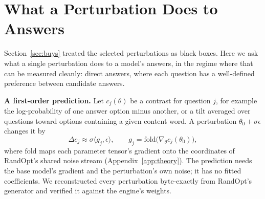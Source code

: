 \documentclass{article}
\begin{document}
\begin{table}[t]
  \centering\small
  \caption{\textbf{Same-run results} ($N{=}5000$, $K{=}50$; accuracy in \%, differences in points with paired 95\% CIs).
  SC: self-consistency over 50 samples of the unperturbed model; 1 gen.: one greedy answer of the unperturbed model
  (same engine as SC), so within a prompt block SC@50 $-$ 1 gen.\ is the voting effect and across blocks 1 gen.\ is the
  prompt effect. The chosen prompt (in parentheses) maximizes base accuracy on RandOpt's 200 selection questions among
  our three candidates; the public template is chosen by the same rule among public evaluation templates fixed before
  any was run (Section~\ref{sec:ps}).}
  \label{tab:samerun}
  \footnotesize\setlength{\tabcolsep}{3pt}
  \resizebox{\textwidth}{!}{}
\end{table}

\section{What a Perturbation Does to Answers}\label{sec:law}
Section~\ref{sec:buys} treated the selected perturbations as black boxes. Here we ask what a single perturbation does to
a model's answers, in the regime where that can be measured cleanly: direct answers, where each question has a
well-defined preference between candidate answers.

\textbf{A first-order prediction.} Let $c_j(\theta)$ be a contrast for question $j$, for example the log-probability of
one answer option minus another, or a tilt averaged over questions toward options containing a given content word. A
perturbation $\theta_0 + \sigma\epsilon$ changes it by
\begin{equation}
  \Delta c_j \approx \sigma \langle g_j, \epsilon \rangle, \qquad g_j = \mathrm{fold}\big(\nabla_\theta c_j(\theta_0)\big),
  \label{eq:law}
\end{equation}
where $\mathrm{fold}$ maps each parameter tensor's gradient onto the coordinates of RandOpt's shared noise stream
(Appendix~\ref{app:theory}). The prediction needs the base model's gradient and the perturbation's own noise; it has no
fitted coefficients. We reconstructed every perturbation byte-exactly from RandOpt's generator and verified it against
the engine's weights.
\end{document}
